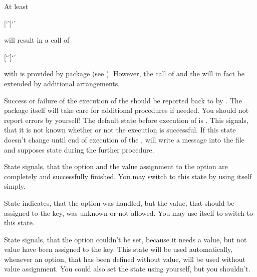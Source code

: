 \begin{Explain}
  \label{explain:scrbase.macro.DefineFamilyKey}%
  At least
\begin{lstcode}[escapeinside=`']
                  [`']{`'}
\end{lstcode}
  will result in a call of
\begin{lstcode}[moretexcs={define@key},escapeinside=`']
             [`']{`'}
\end{lstcode}
  with  is provided by package
   (see \cite{package:keyval}). However,
  the call of  and the  will in fact be
  extended by additional arrangements.
\end{Explain}

Success or failure of the execution of the
 should be reported back to  by
. The package itself will take care for additional
procedures if needed. You should not report errors by yourself! The default
state before execution of  is
. This signals, that it is not known whether or
not the execution is successful. If this state doesn't change until end of
execution of the ,  will write a message into
the  file and supposes state  during
the further procedure.

State  signals, that the option and the value
assignment to the option are completely and successfully finished. You may
switch to this state by using  itself simply.

State  indicates, that the option was
handled, but the value, that should be assigned to the key, was unknown or not
allowed. You may use  itself to switch to
this state.

State  signals, that the option couldn't be
set, because it needs a value, but not value have been assigned to the
key. This state will be used automatically, whenever an option, that has been
defined without  value, will be used without value
assignment. You could also set the state using 
yourself, but you shouldn't.

